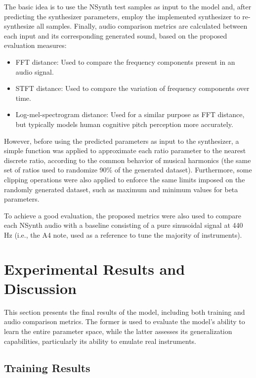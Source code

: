 \documentclass[10pt,conference]{IEEEtran}
\begin{document}
The basic idea is to use the NSynth test samples as input to the model and, after predicting the synthesizer parameters, employ the implemented synthesizer to re-synthesize all samples. Finally, audio comparison metrics are calculated between each input and its corresponding generated sound, based on the proposed evaluation measures:

\begin{itemize}
    \item FFT distance: Used to compare the frequency components present in an audio signal.
    \item STFT distance: Used to compare the variation of frequency components over time.
    \item Log-mel-spectrogram distance: Used for a similar purpose as FFT distance, but typically models human cognitive pitch perception more accurately.
\end{itemize}

However, before using the predicted parameters as input to the synthesizer, a simple function was applied to approximate each ratio parameter to the nearest discrete ratio, according to the common behavior of musical harmonics (the same set of ratios used to randomize 90\% of the generated dataset). Furthermore, some clipping operations were also applied to enforce the same limits imposed on the randomly generated dataset, such as maximum and minimum values for beta parameters.

To achieve a good evaluation, the proposed metrics were also used to compare each NSynth audio with a baseline consisting of a pure sinusoidal signal at 440 Hz (i.e., the A4 note, used as a reference to tune the majority of instruments).

\section{Experimental Results and Discussion}  \label{sec:experiments}

This section presents the final results of the model, including both training and audio comparison metrics. The former is used to evaluate the model’s ability to learn the entire parameter space, while the latter assesses its generalization capabilities, particularly its ability to emulate real instruments.

\subsection{Training Results}
\end{document}
